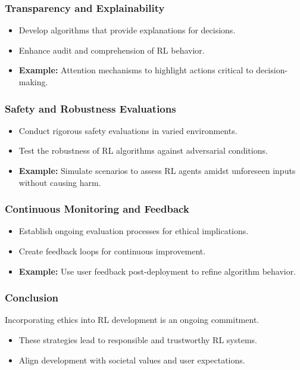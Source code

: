 \documentclass{beamer}
\begin{document}
\begin{frame}[fragile]
    \frametitle{Transparency and Explainability}
    \begin{itemize}
        \item Develop algorithms that provide explanations for decisions.
        \item Enhance audit and comprehension of RL behavior.
        \item \textbf{Example:} Attention mechanisms to highlight actions critical to decision-making.
    \end{itemize}
\end{frame}

\begin{frame}[fragile]
    \frametitle{Safety and Robustness Evaluations}
    \begin{itemize}
        \item Conduct rigorous safety evaluations in varied environments.
        \item Test the robustness of RL algorithms against adversarial conditions.
        \item \textbf{Example:} Simulate scenarios to assess RL agents amidst unforeseen inputs without causing harm.
    \end{itemize}
\end{frame}

\begin{frame}[fragile]
    \frametitle{Continuous Monitoring and Feedback}
    \begin{itemize}
        \item Establish ongoing evaluation processes for ethical implications.
        \item Create feedback loops for continuous improvement.
        \item \textbf{Example:} Use user feedback post-deployment to refine algorithm behavior.
    \end{itemize}
\end{frame}

\begin{frame}[fragile]
    \frametitle{Conclusion}
    Incorporating ethics into RL development is an ongoing commitment.
    
    \begin{itemize}
        \item These strategies lead to responsible and trustworthy RL systems.
        \item Align development with societal values and user expectations.
    \end{itemize}
\end{frame}
\end{document}
